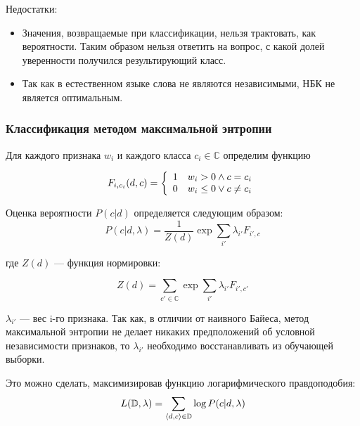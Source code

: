 Недостатки:
\begin{itemize}

\item
Значения, возвращаемые при классификации, нельзя трактовать, 
как вероятности. Таким образом нельзя ответить на вопрос, 
с какой долей уверенности получился результирующий класс. 

\item
Так как в естественном языке слова не являются независимыми,
НБК не является оптимальным.

\end{itemize}

\subsubsection{Классификация методом максимальной энтропии}

Для каждого признака $w_i$ и каждого класса $c_i \in \mathbb{C}$
определим функцию

\begin{equation}
F_{i, c_i}(d, c) = \left\{
\begin{array}{c l}
    1 & {w_i > 0 \wedge c = c_i}  \\   
    0 & {w_i \leq 0\vee c \neq  c_i}
\end{array}\right.
\end{equation}

Оценка вероятности $P(c | d)$ определяется следующим образом:
\begin{equation}
P(c | d, \lambda) = \frac{1}{Z(d)} \exp{\sum\limits_{i'} \lambda_{i'} F_{i', c}}
\end{equation}

где $Z(d)$ --- функция нормировки:

\begin{equation}
Z(d) = \sum\limits_{c' \in \mathbb{C}} \exp{\sum\limits_{i'} \lambda_{i'} F_{i', c'}}
\end{equation}

$\lambda_{i'}$ --- вес i-го признака. Так как, в отличии от наивного Байеса,
метод максимальной энтропии не делает никаких предположений
об условной независимости признаков, то $\lambda_{i'}$ необходимо
восстанавливать из обучающей выборки.

Это можно сделать, максимизировав функцию логарифмического правдоподобия:
\begin{equation}
L(\mathbb{D}, \lambda) = \sum\limits_{\left \langle d, c \right \rangle  \in \mathbb{D}} \log P(c|d, \lambda)
\end{equation}

